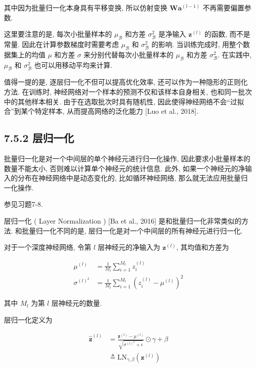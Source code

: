 \documentclass[10pt]{article}
\begin{document}
其中因为批量归一化本身具有平移变换, 所以仿射变换 $\boldsymbol{W} \boldsymbol{a}^{(l-1)}$ 不再需要偏置参数.

这里要注意的是, 每次小批量样本的 $\mu_{\mathcal{B}}$ 和方差 $\sigma_{\mathcal{B}}^{2}$ 是净输入 $\boldsymbol{z}^{(l)}$ 的函数, 而不是常量. 因此在计算参数梯度时需要考虑 $\mu_{\mathcal{B}}$ 和 $\sigma_{\mathcal{B}}^{2}$ 的影响. 当训练完成时, 用整个数据集上的均值 $\mu$ 和方差 $\sigma$ 来分别代替每次小批量样本的 $\mu_{\mathcal{B}}$ 和方差 $\sigma_{\mathcal{B}}^{2}$. 在实践中, $\mu_{\mathcal{B}}$ 和 $\sigma_{\mathcal{B}}^{2}$ 也可以用移动平均来计算.

值得一提的是, 逐层归一化不但可以提高优化效率, 还可以作为一种隐形的正则化方法. 在训练时, 神经网络对一个样本的预测不仅和该样本自身相关, 也和同一批次中的其他样本相关. 由于在选取批次时具有随机性, 因此使得神经网络不会“过拟合”到某个特定样本, 从而提高网络的泛化能力 [Luo et al., 2018].

\subsection*{7.5.2 层归一化}
批量归一化是对一个中间层的单个神经元进行归一化操作, 因此要求小批量样本的数量不能太小, 否则难以计算单个神经元的统计信息. 此外, 如果一个神经元的净输入的分布在神经网络中是动态变化的, 比如循环神经网络, 那么就无法应用批量归一化操作.

参见习题7-8.

层归一化 ( Layer Normalization ) [Ba et al., 2016] 是和批量归一化非常类似的方法. 和批量归一化不同的是, 层归一化是对一个中间层的所有神经元进行归一化.

对于一个深度神经网络, 令第 $l$ 层神经元的净输入为 $\boldsymbol{z}^{(l)}$, 其均值和方差为


\begin{align*}
\mu^{(l)} & =\frac{1}{M_{l}} \sum_{i=1}^{M_{l}} z_{i}^{(l)}  \tag{7.58}\\
\sigma^{(l)^{2}} & =\frac{1}{M_{l}} \sum_{i=1}^{M_{l}}\left(z_{i}^{(l)}-\mu^{(l)}\right)^{2} \tag{7.59}
\end{align*}


其中 $M_{l}$ 为第 $l$ 层神经元的数量.

层归一化定义为


\begin{align*}
\hat{\boldsymbol{z}}^{(l)} & =\frac{\boldsymbol{z}^{(l)}-\mu^{(l)}}{\sqrt{\sigma^{(l)^{2}}+\epsilon}} \odot \gamma+\beta  \tag{7.60}\\
& \triangleq \mathrm{LN}_{\gamma, \beta}\left(\boldsymbol{z}^{(l)}\right) \tag{7.61}
\end{align*}
\end{document}
